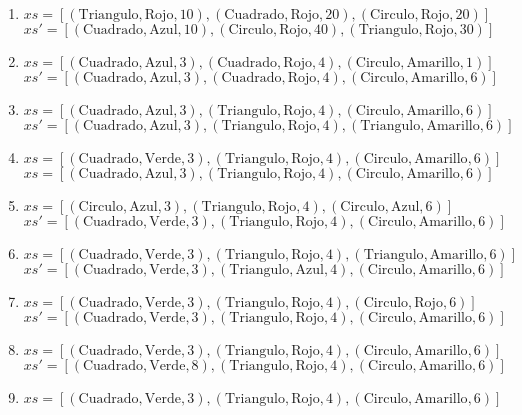 \documentclass[12pt]{article} %
\begin{document}
\begin{enumerate}
    \begin{enumerate}
        \item
        \( xs = [(\text{Triangulo}, \text{Rojo},10),(\text{Cuadrado}, \text{Rojo},20),(\text{Circulo}, \text{Rojo}, 20)] \) 
            \( xs' = [(\text{Cuadrado}, \text{Azul}, 10),(\text{Circulo}, \text{Rojo},40),(\text{Triangulo}, \text{Rojo},30)] \)
        \item
        \(  xs = [(\text{Cuadrado}, \text{Azul}, 3),(\text{Cuadrado}, \text{Rojo}, 4), (\text{Circulo}, \text{Amarillo}, 1)] \) 
            \(  xs' = [(\text{Cuadrado}, \text{Azul}, 3),(\text{Cuadrado}, \text{Rojo}, 4), (\text{Circulo}, \text{Amarillo}, 6)] \)
        \item
        \( xs = [(\text{Cuadrado}, \text{Azul}, 3),(\text{Triangulo}, \text{Rojo}, 4), (\text{Circulo}, \text{Amarillo}, 6)] \) 
            \( xs' = [(\text{Cuadrado}, \text{Azul}, 3),(\text{Triangulo}, \text{Rojo}, 4), (\text{Triangulo}, \text{Amarillo}, 6)] \)
        \item
        \( xs = [(\text{Cuadrado}, \text{Verde}, 3),(\text{Triangulo}, \text{Rojo}, 4), (\text{Circulo}, \text{Amarillo}, 6)]  \) 
            \( xs = [(\text{Cuadrado}, \text{Azul}, 3),(\text{Triangulo}, \text{Rojo}, 4), (\text{Circulo}, \text{Amarillo}, 6)] \)
        \item
        \( xs = [(\text{Circulo}, \text{Azul}, 3),(\text{Triangulo}, \text{Rojo}, 4), (\text{Circulo}, \text{Azul}, 6)]  \) \\
            \( xs' = [(\text{Cuadrado}, \text{Verde}, 3),(\text{Triangulo}, \text{Rojo}, 4), (\text{Circulo}, \text{Amarillo}, 6)] \)
        \item
        \(xs = [(\text{Cuadrado}, \text{Verde}, 3),(\text{Triangulo}, \text{Rojo}, 4), (\text{Triangulo}, \text{Amarillo}, 6)] \) 
        \( xs' = [(\text{Cuadrado}, \text{Verde}, 3),(\text{Triangulo}, \text{Azul}, 4), (\text{Circulo}, \text{Amarillo}, 6)] \)
        \item
        \( xs = [(\text{Cuadrado}, \text{Verde}, 3),(\text{Triangulo}, \text{Rojo}, 4), (\text{Circulo}, \text{Rojo}, 6)] \) 
        \(xs' = [(\text{Cuadrado}, \text{Verde}, 3),(\text{Triangulo}, \text{Rojo}, 4), (\text{Circulo}, \text{Amarillo}, 6)] \)
        \item
        \( xs = [(\text{Cuadrado}, \text{Verde}, 3),(\text{Triangulo}, \text{Rojo}, 4), (\text{Circulo}, \text{Amarillo}, 6)] \) 
            \( xs' = [(\text{Cuadrado}, \text{Verde}, 8),(\text{Triangulo}, \text{Rojo}, 4), (\text{Circulo}, \text{Amarillo}, 6)] \)
        \item
            \( xs = [(\text{Cuadrado}, \text{Verde}, 3),(\text{Triangulo}, \text{Rojo}, 4), (\text{Circulo}, \text{Amarillo}, 6)] \) 
    \end{enumerate}


\end{enumerate}
\end{document}
